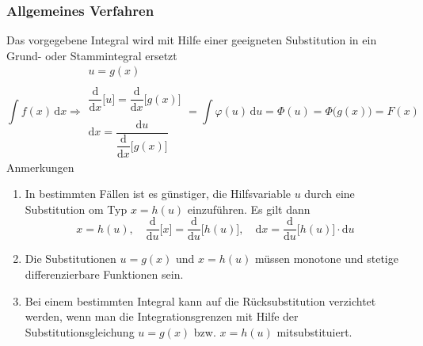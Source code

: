 \subsubsection{Allgemeines Verfahren}
Das vorgegebene Integral wird mit Hilfe einer geeigneten Substitution in ein Grund- oder Stammintegral ersetzt
\begin{equation}
\boxed{\displaystyle \int f\left(x\right)\,\text{d}x\Rightarrow \begin{matrix}u=g\left(x\right)\\\\\dfrac{\text{d}}{\text{d}x}\Big[u\Big]=\dfrac{\text{d}}{\text{d}x}\Big[g\left(x\right)\Big]\\\\\text{d}x=\dfrac{\text{d}u}{\dfrac{\text{d}}{\text{d}x}\Big[g\left(x\right)\Big]}\end{matrix}=\displaystyle \int \varphi\left(u\right)\,\text{d}u=\Phi\left(u\right)=\Phi\Big(g\left(x\right)\Big)=F\left(x\right)}
\end{equation}
Anmerkungen
\begin{enumerate}[$(i)$]
\item In bestimmten Fällen ist es günstiger, die Hilfsvariable $u$ durch eine Substitution om Typ $x=h\left(u\right)$ einzuführen. Es gilt dann
\begin{equation} 
\boxed{x=h\left(u\right),\quad \dfrac{\text{d}}{\text{d}u}\Big[x\Big]=\dfrac{\text{d}}{\text{d}u}\Big[h\left(u\right)\Big],\quad \text{d}x=\dfrac{\text{d}}{\text{d}u}\Big[h\left(u\right)\Big]\cdot \text{d}u}
\end{equation} 
\item Die Substitutionen $u=g\left(x\right)$ und $x=h\left(u\right)$ müssen monotone und stetige differenzierbare Funktionen sein.
\item Bei einem bestimmten Integral kann auf die Rücksubstitution verzichtet werden, wenn man die Integrationsgrenzen mit Hilfe der Substitutionsgleichung $u=g\left(x\right)$ bzw. $x=h\left(u\right)$ mitsubstituiert. 
\end{enumerate}
